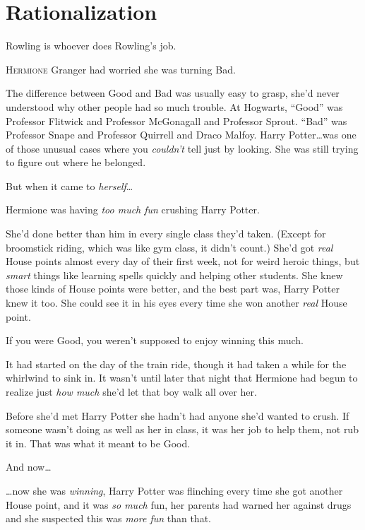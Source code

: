 \chapter{Rationalization}

\begin{chapterOpeningAuthorNote}
Rowling is whoever does Rowling's job.
\end{chapterOpeningAuthorNote}

\lettrine{H}{ermione} Granger had worried she was turning Bad.

\hplettrineextrapara
The difference between Good and Bad was usually easy to grasp, she’d never understood why other people had so much trouble. At Hogwarts, “Good” was Professor Flitwick and Professor McGonagall and Professor Sprout. “Bad” was Professor Snape and Professor Quirrell and Draco Malfoy. Harry Potter…was one of those unusual cases where you \emph{couldn’t} tell just by looking. She was still trying to figure out where he belonged.

But when it came to \emph{herself}…

Hermione was having \emph{too much fun} crushing Harry Potter.

She’d done better than him in every single class they’d taken. (Except for broomstick riding, which was like gym class, it didn’t count.) She’d got \emph{real} House points almost every day of their first week, not for weird heroic things, but \emph{smart} things like learning spells quickly and helping other students. She knew those kinds of House points were better, and the best part was, Harry Potter knew it too. She could see it in his eyes every time she won another \emph{real} House point.

If you were Good, you weren’t supposed to enjoy winning this much.

It had started on the day of the train ride, though it had taken a while for the whirlwind to sink in. It wasn’t until later that night that Hermione had begun to realize just \emph{how much} she’d let that boy walk all over her.

Before she’d met Harry Potter she hadn’t had anyone she’d wanted to crush. If someone wasn’t doing as well as her in class, it was her job to help them, not rub it in. That was what it meant to be Good.

And now…

…now she was \emph{winning}, Harry Potter was flinching every time she got another House point, and it was \emph{so much} fun, her parents had warned her against drugs and she suspected this was \emph{more fun} than that.

